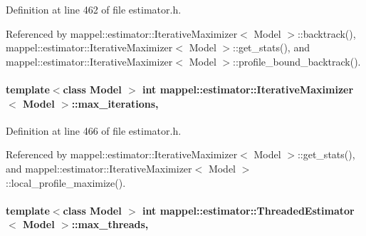 Definition at line 462 of file estimator.\+h.



Referenced by mappel\+::estimator\+::\+Iterative\+Maximizer$<$ Model $>$\+::backtrack(), mappel\+::estimator\+::\+Iterative\+Maximizer$<$ Model $>$\+::get\+\_\+stats(), and mappel\+::estimator\+::\+Iterative\+Maximizer$<$ Model $>$\+::profile\+\_\+bound\+\_\+backtrack().

\paragraph[{\texorpdfstring{max\+\_\+iterations}{max_iterations}}]{\setlength{\rightskip}{0pt plus 5cm}template$<$class Model $>$ int {\bf mappel\+::estimator\+::\+Iterative\+Maximizer}$<$ Model $>$\+::max\+\_\+iterations\hspace{0.3cm}{\ttfamily [protected]}, {\ttfamily [inherited]}}\hypertarget{classmappel_1_1estimator_1_1IterativeMaximizer_abf5fe0b08cfbcc403c3d01511726aa38}{}\label{classmappel_1_1estimator_1_1IterativeMaximizer_abf5fe0b08cfbcc403c3d01511726aa38}


Definition at line 466 of file estimator.\+h.



Referenced by mappel\+::estimator\+::\+Iterative\+Maximizer$<$ Model $>$\+::get\+\_\+stats(), and mappel\+::estimator\+::\+Iterative\+Maximizer$<$ Model $>$\+::local\+\_\+profile\+\_\+maximize().

\paragraph[{\texorpdfstring{max\+\_\+threads}{max_threads}}]{\setlength{\rightskip}{0pt plus 5cm}template$<$class Model $>$ int {\bf mappel\+::estimator\+::\+Threaded\+Estimator}$<$ Model $>$\+::max\+\_\+threads\hspace{0.3cm}{\ttfamily [protected]}, {\ttfamily [inherited]}}\hypertarget{classmappel_1_1estimator_1_1ThreadedEstimator_ab4c55ecff71dff47c0584ce20fe7f077}{}\label{classmappel_1_1estimator_1_1ThreadedEstimator_ab4c55ecff71dff47c0584ce20fe7f077}



